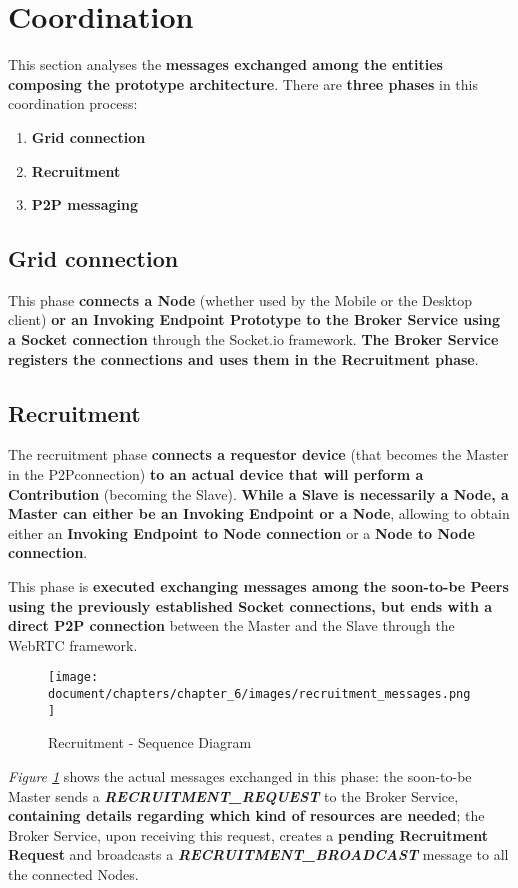 \section{Coordination}\label{coordination}
This section analyses the \textbf{messages exchanged among the entities composing the prototype architecture}. There are \textbf{three phases} in this coordination process:
\begin{enumerate}
    \item \textbf{Grid connection}
    \item \textbf{Recruitment}
    \item \textbf{P2P messaging}
\end{enumerate}

\subsection{Grid connection}
This phase \textbf{connects a Node} (whether used by the Mobile or the Desktop client) \textbf{or an Invoking Endpoint Prototype to the Broker Service using a Socket connection} through the Socket.io framework. \textbf{The Broker Service registers the connections and uses them in the Recruitment phase}.

\subsection{Recruitment}
The recruitment phase \textbf{connects a requestor device} (that becomes the Master in the P2Pconnection) \textbf{to an actual device that will perform a Contribution} (becoming the Slave). \textbf{While a Slave is necessarily a Node, a Master can either be an Invoking Endpoint or a Node}, allowing to obtain either an \textbf{Invoking Endpoint to Node connection} or a \textbf{Node to Node connection}.

This phase is \textbf{executed exchanging messages among the soon-to-be Peers using the previously established Socket connections, but ends with a direct P2P connection} between the Master and the Slave through the WebRTC framework.

\begin{figure}[!ht]
    \centering
    \texttt{[image: document/chapters/chapter\_6/images/recruitment\_messages.png]}
    \caption{Recruitment - Sequence Diagram}
    \label{fig:recruitment_messages}
\end{figure}

\textit{Figure \ref{fig:recruitment_messages}} shows the actual messages exchanged in this phase: the soon-to-be Master sends a \textbf{\textit{RECRUITMENT\_REQUEST}} to the Broker Service, \textbf{containing details regarding which kind of resources are needed}; the Broker Service, upon receiving this request, creates a \textbf{pending Recruitment Request} and broadcasts a \textbf{\textit{RECRUITMENT\_BROADCAST}} message to all the connected Nodes.

